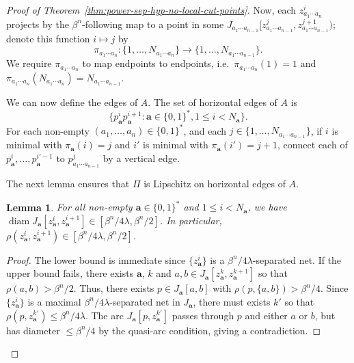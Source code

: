 \documentclass[11pt]{amsart}
\numberwithin{equation}{section}
\newtheorem{lemma}[equation]{Lemma}
\theoremstyle{citing}
\DeclareMathOperator{\diam}{diam}
\newcommand{\ba}{\mathbf{a}}
\numberwithin{equation}{section}
\begin{document}
\begin{proof}[Proof of Theorem~\ref{thm:power-sep-hyp-no-local-cut-points}]
    
    
	Now, each $z_{a_1\cdots a_{n}}^i$ projects by the $\beta^n$-following map to a point in some $J_{a_1\cdots a_{n-1}}[z_{a_1\cdots a_{n-1}}^j, z_{a_1\cdots a_{n-1}}^{j+1})$; denote this function $i\mapsto j$ by 
	\[ \pi_{a_1\cdots a_n}: \{1,\ldots, N_{a_1\cdots a_n}\} \to \{1,\ldots,N_{a_1\cdots a_{n-1}}\}. \]  
	We require $\pi_{a_1\cdots a_n}$ to map endpoints to endpoints, i.e.\ 
	$\pi_{a_1\cdots a_n}(1)=1$ and
	$\pi_{a_1\cdots a_n}(N_{a_1\cdots a_n})=N_{a_1\cdots a_{n-1}}$.

    We can now define the edges of $A$. The set of horizontal edges of $A$ is
    \[
        \{p_\ba^ip_\ba^{i+1}: \ba \in \{0,1\}^*, 1 \leq i < N_{\ba}\}.
    \]
    For each non-empty $(a_1,\ldots,a_n) \in \{0,1\}^*$, and each $j \in \{1,\ldots, N_{a_1\cdots a_{n-1}}\}$, if $i$ is minimal with $\pi_\ba(i)=j$ and $i'$ is minimal with $\pi_\ba(i')=j+1$, connect each of $p_\ba^i,\ldots,p_\ba^{i'-1}$ to $p_{a_1\cdots a_{n-1}}^j$ by a vertical edge.

	The next lemma ensures that $\Pi$ is Lipschitz on horizontal edges of $A$.
    
	\begin{lemma}\label{lem:cantorarcs1} For all non-empty $\ba \in \{0,1\}^*$ and $1 \leq i< N_\ba$, we have $\diam J_\ba[z_\ba^i, z_\ba^{i+1}] \in [\beta^n/4\lambda,\beta^n/2]$.  In particular, $\rho(z_\ba^i, z_\ba^{i+1}) \in [\beta^n/4\lambda,\beta^n/2]$.
	\end{lemma}
	\begin{proof}
		The lower bound is immediate since $\{z_\ba^i\}$ is a $\beta^n/4\lambda$-separated net.
		If the upper bound fails, there exists $\ba$, $k$ and $a,b \in J_\ba[z_\ba^k,z_\ba^{k+1}]$ so that $\rho(a,b) > \beta^n/2$.  Thus, there exists $p \in J_\ba[a,b]$ with $\rho(p, \{a,b\}) > \beta^n/4$.
		Since $\{z_\ba^i\}$ is a maximal $\beta^n/4\lambda$-separated net in $J_\ba$, there must exists $k'$ so that $\rho(p,z_\ba^{k'}) \leq \beta^n/4\lambda$.
		The arc $J_\ba[p, z_\ba^{k'}]$ passes through $p$ and either $a$ or $b$, but has diameter $\leq \beta^n/4$ by the quasi-arc condition, giving a contradiction.
	\end{proof}


\end{proof}
\end{document}

